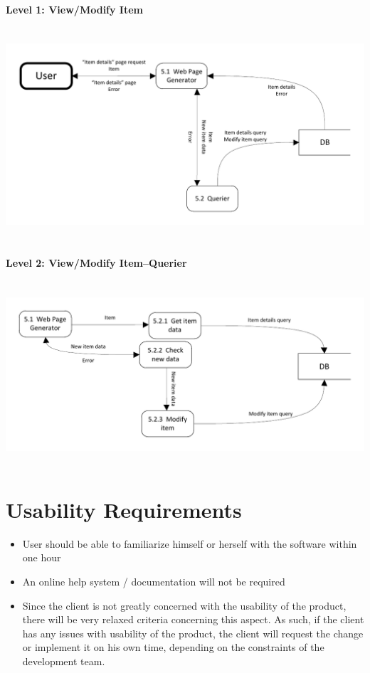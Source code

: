 \documentclass{article}
\begin{document}
\paragraph{Level 1: View/Modify Item}
~\\
\includegraphics[keepaspectratio, width=6.5in]{dfd_level1_view_modify_item.pdf}\\
~\\

\paragraph{Level 2: View/Modify Item--Querier}
~\\
\includegraphics[keepaspectratio, width=6.5in]{dfd_level2_view_modify_item_querier.pdf}\\
~\\

\section{Usability Requirements}
\label{usability}
\begin{itemize}
\item User should be able to familiarize himself or herself with the software within one hour
\item An online help system / documentation will not be required
\item Since the client is not greatly concerned with the usability of the product, there will be very relaxed criteria concerning this aspect.  As such, if the client has any issues with usability of the product, the client will request the change or implement it on his own time, depending on the constraints of the development team.
\end{itemize}
\end{document}
